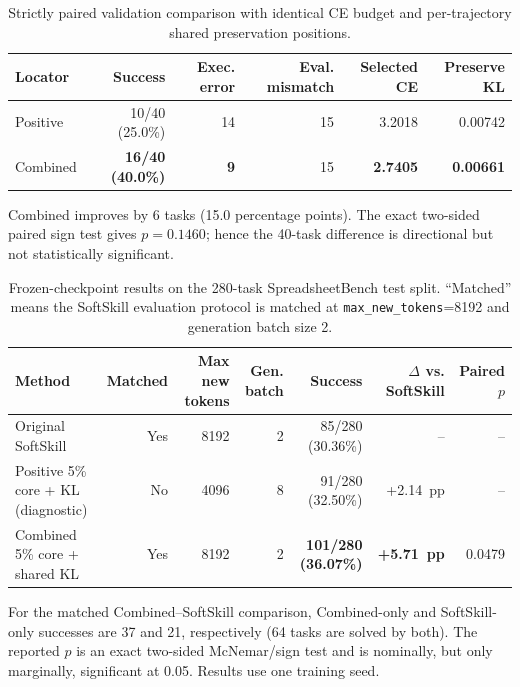 \documentclass[10pt]{article}
\newcommand{\best}[1]{\textbf{#1}}
\newcommand{\pp}{~pp}
\begin{document}
\begin{table}[t]
  \centering
  \caption{Strictly paired validation comparison with identical CE budget and
  per-trajectory shared preservation positions.}
  \label{tab:shared-preservation-validation}
  \small
  \begin{tabular}{lrrrrr}
    \toprule
    Locator & Success & Exec. error & Eval. mismatch & Selected CE & Preserve KL \\
    \midrule
    Positive & 10/40 (25.0\%) & 14 & 15 & 3.2018 & 0.00742 \\
    Combined & \best{16/40 (40.0\%)} & \best{9} & 15 & \best{2.7405} & \best{0.00661} \\
    \bottomrule
  \end{tabular}

  \vspace{2pt}
  \parbox{0.94\linewidth}{\footnotesize
  Combined improves by 6 tasks (15.0 percentage points). The exact two-sided
  paired sign test gives $p=0.1460$; hence the 40-task difference is directional
  but not statistically significant.}
\end{table}

\begin{table}[t]
  \centering
  \caption{Frozen-checkpoint results on the 280-task SpreadsheetBench test split.
  ``Matched'' means the SoftSkill evaluation protocol is matched at
  \texttt{max\_new\_tokens}=8192 and generation batch size 2.}
  \label{tab:test-main}
  \small
  \begin{tabular}{lrrrrrr}
    \toprule
    Method & Matched & Max new tokens & Gen. batch & Success & $\Delta$ vs. SoftSkill & Paired $p$ \\
    \midrule
    Original SoftSkill & Yes & 8192 & 2 & 85/280 (30.36\%) & -- & -- \\
    Positive 5\% core + KL (diagnostic) & No & 4096 & 8 & 91/280 (32.50\%) & +2.14\pp & -- \\
    Combined 5\% core + shared KL & Yes & 8192 & 2 & \best{101/280 (36.07\%)} & \best{+5.71\pp} & 0.0479 \\
    \bottomrule
  \end{tabular}

  \vspace{2pt}
  \parbox{0.95\linewidth}{\footnotesize
  For the matched Combined--SoftSkill comparison, Combined-only and
  SoftSkill-only successes are 37 and 21, respectively (64 tasks are solved by
  both). The reported $p$ is an exact two-sided McNemar/sign test and is nominally,
  but only marginally, significant at 0.05. Results use one training seed.}
\end{table}
\end{document}
